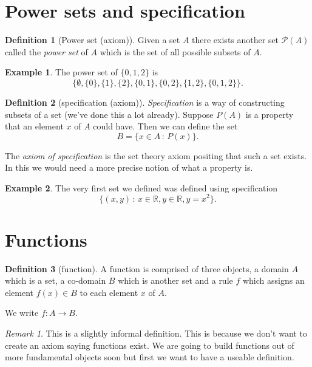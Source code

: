 \documentclass[
]{book}
\theoremstyle{definition}
\newtheorem{definition}{Definition}[chapter]
\theoremstyle{definition}
\newtheorem{example}{Example}[chapter]
\theoremstyle{definition}
\theoremstyle{definition}
\theoremstyle{remark}
\newtheorem*{remark}{Remark}
\begin{document}
\section{Power sets and specification}\label{power-sets-and-specification}

\begin{definition}[Power set (axiom)]
Given a set \(A\) there exists another set \(\mathcal{P}(A)\) called the \emph{power set} of \(A\) which is the set of all possible subsets of \(A\).
\end{definition}

\begin{example}
The power set of \(\{0,1,2\}\) is
\[ \{ \emptyset, \{0\}, \{1\}, \{2\}, \{0,1\}, \{0,2\}, \{1,2\}, \{0,1,2\}\}.  \]
\end{example}

\begin{definition}[specification (axiom)]
\emph{Specification} is a way of constructing subsets of a set (we've done this a lot already). Suppose \(P(A)\) is a property that an element \(x\) of \(A\) could have. Then we can define the set
\[ B = \{ x \in A \,:\, P(x)\}.  \]
\end{definition}

The \emph{axiom of specification} is the set theory axiom positing that such a set exists. In this we would need a more precise notion of what a property is.

\begin{example}
The very first set we defined was defined using specification
\[ \{(x, y)\,:\, x \in \mathbb{R}, y \in \mathbb{R}, y=x^2\}.  \]
\end{example}

\section{Functions}\label{functions}

\begin{definition}[function]
A function is comprised of three objects, a domain \(A\) which is a set, a co-domain \(B\) which is another set and a rule \(f\) which assigns an element \(f(x) \in B\) to each element \(x\) of \(A\).

We write \(f: A \rightarrow B\).
\end{definition}

\begin{remark}
This is a slightly informal definition. This is because we don't want to create an axiom saying functions exist. We are going to build functions out of more fundamental objects soon but first we want to have a useable definition.
\end{remark}
\end{document}
